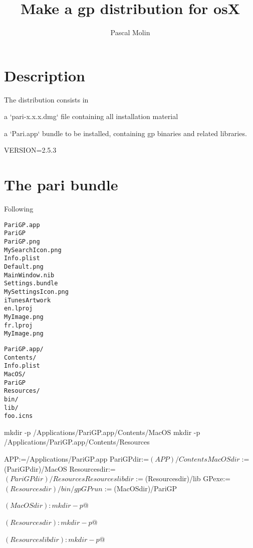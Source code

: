 \documentclass[article]{pastex}
\author{Pascal Molin}
\title{Make a gp distribution for osX}
\begin{document}
\section{Description}

The distribution consists in

a `pari-x.x.x.dmg` file containing all installation material


a `Pari.app` bundle to be installed, containing gp binaries and related
libraries.

\begin{code}[make]
VERSION=2.5.3
\end{code}

\section{The pari bundle}

Following \url{}
\begin{alltt}
PariGP.app
   PariGP
   PariGP.png
   MySearchIcon.png
   Info.plist
   Default.png
   MainWindow.nib
   Settings.bundle
   MySettingsIcon.png
   iTunesArtwork
   en.lproj
     MyImage.png
   fr.lproj
     MyImage.png
\end{alltt}


\begin{alltt}
PariGP.app/
  Contents/
    Info.plist
    MacOS/
      PariGP
    Resources/
      bin/
      lib/
      foo.icns
\end{alltt}

\begin{code}[sh]
mkdir -p /Applications/PariGP.app/Contents/MacOS
mkdir -p /Applications/PariGP.app/Contents/Resources
\end{code}

\begin{code}[make]
APP:=/Applications/PariGP.app
PariGPdir:=$(APP)/Contents
MacOSdir:=$(PariGPdir)/MacOS
Resourcesdir:=$(PariGPdir)/Resources
Resourceslibdir:=$(Resourcesdir)/lib
GPexe:=$(Resourcesdir)/bin/gp
GPrun:=$(MacOSdir)/PariGP

$(MacOSdir):
	mkdir -p $@

$(Resourcesdir):
	mkdir -p $@

$(Resourceslibdir):
	mkdir -p $@
  
\end{code}
\end{document}
